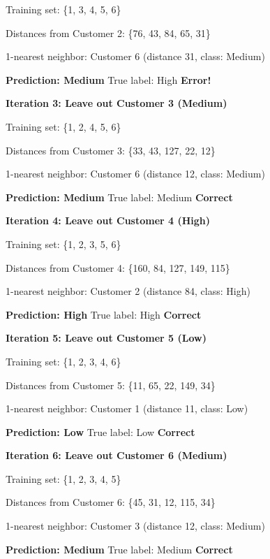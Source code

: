 \documentclass[12pt]{article}
\begin{document}
\begin{solution}
Training set: \{1, 3, 4, 5, 6\}

Distances from Customer 2: \{76, 43, 84, 65, 31\}

1-nearest neighbor: Customer 6 (distance 31, class: Medium)

\textbf{Prediction: Medium} \quad True label: High \quad \textbf{Error!}

\textbf{Iteration 3: Leave out Customer 3 (Medium)}

Training set: \{1, 2, 4, 5, 6\}

Distances from Customer 3: \{33, 43, 127, 22, 12\}

1-nearest neighbor: Customer 6 (distance 12, class: Medium)

\textbf{Prediction: Medium} \quad True label: Medium \quad \checkmark \textbf{Correct}

\textbf{Iteration 4: Leave out Customer 4 (High)}

Training set: \{1, 2, 3, 5, 6\}

Distances from Customer 4: \{160, 84, 127, 149, 115\}

1-nearest neighbor: Customer 2 (distance 84, class: High)

\textbf{Prediction: High} \quad True label: High \quad \checkmark \textbf{Correct}

\textbf{Iteration 5: Leave out Customer 5 (Low)}

Training set: \{1, 2, 3, 4, 6\}

Distances from Customer 5: \{11, 65, 22, 149, 34\}

1-nearest neighbor: Customer 1 (distance 11, class: Low)

\textbf{Prediction: Low} \quad True label: Low \quad \checkmark \textbf{Correct}

\textbf{Iteration 6: Leave out Customer 6 (Medium)}

Training set: \{1, 2, 3, 4, 5\}

Distances from Customer 6: \{45, 31, 12, 115, 34\}

1-nearest neighbor: Customer 3 (distance 12, class: Medium)

\textbf{Prediction: Medium} \quad True label: Medium \quad \checkmark \textbf{Correct}


\end{solution}
\end{document}
